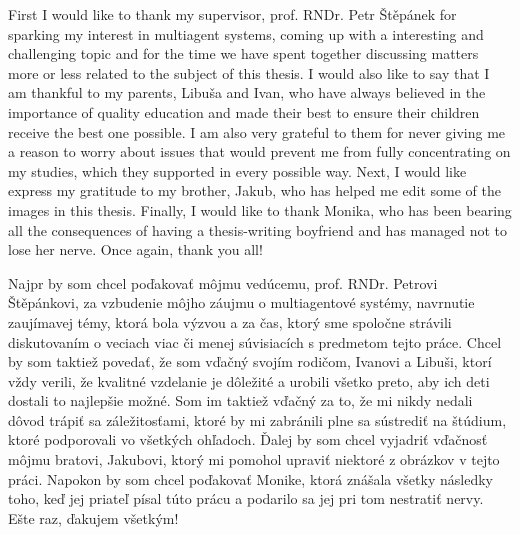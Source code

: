 
First I would like to thank my supervisor, prof. RNDr. Petr Štěpánek for sparking my interest in multiagent systems, coming up with a interesting and challenging topic and for the time we have spent together discussing matters more or less related to the subject of this thesis.
I would also like to say that I am thankful to my parents, Libuša and Ivan, who have always believed in the importance of quality education and made their best to ensure their children receive the best one possible.
I am also very grateful to them for never giving me a reason to worry about issues that would prevent me from fully concentrating on my studies, which they supported in every possible way.
Next, I would like express my gratitude to my brother, Jakub, who has helped me edit some of the images in this thesis.
Finally, I would like to thank Monika, who has been bearing all the consequences of having a thesis-writing boyfriend and has managed not to lose her nerve.
Once again, thank you all!

\frenchspacing

Najpr by som chcel poďakovať môjmu vedúcemu, prof. RNDr. Petrovi Štěpánkovi, za vzbudenie môjho záujmu o multiagentové systémy, navrnutie zaujímavej témy, ktorá bola výzvou a za čas, ktorý sme spoločne strávili diskutovaním o veciach viac či menej súvisiacích s predmetom tejto práce.
Chcel by som taktiež povedať, že som vďačný svojím rodičom, Ivanovi a Libuši, ktorí vždy verili, že kvalitné vzdelanie je dôležité a urobili všetko preto, aby ich deti dostali to najlepšie možné.
Som im taktiež vďačný za to, že mi nikdy nedali dôvod trápiť sa záležitosťami, ktoré by mi zabránili plne sa sústrediť na štúdium, ktoré podporovali vo všetkých ohľadoch.
Ďalej by som chcel vyjadriť vďačnosť môjmu bratovi, Jakubovi, ktorý mi pomohol upraviť niektoré z obrázkov v tejto práci.
Napokon by som chcel poďakovať Monike, ktorá znášala všetky následky toho, keď jej priateľ písal túto prácu a podarilo sa jej pri tom nestratiť nervy.
Ešte raz, ďakujem všetkým!

\nonfrenchspacing 